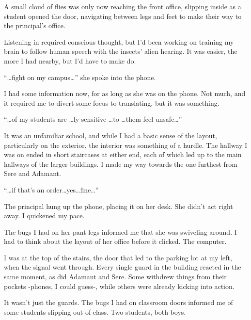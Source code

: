 A small cloud of flies was only now reaching the front office, slipping inside as a student opened the door, navigating between legs and feet to make their way to the principal's office.



Listening in required conscious thought, but I'd been working on training my brain to follow human speech with the insects' alien hearing.  It was easier, the more I had nearby, but I'd have to make do.



``\ldots{}fight on my campus\ldots'' she spoke into the phone.



I had some information now, for as long as she was on the phone.  Not much, and it required me to divert some focus to translating, but it was something.



``\ldots{}of my students are \ldots{}ly sensitive \ldots to \ldots them feel unsafe\ldots''



It was an unfamiliar school, and while I had a basic sense of the layout, particularly on the exterior, the interior was something of a hurdle.  The hallway I was on ended in short staircases at either end, each of which led up to the main hallways of the larger buildings.  I made my way towards the one furthest from Sere and Adamant.



``\ldots{}if that's an order\ldots yes\ldots fine\ldots''



The principal hung up the phone, placing it on her desk.  She didn't act right away.  I quickened my pace.



The bugs I had on her pant legs informed me that she was swiveling around.  I had to think about the layout of her office before it clicked.  The computer.



I was at the top of the stairs, the door that led to the parking lot at my left, when the signal went through.  Every single guard in the building reacted in the same moment, as did Adamant and Sere.  Some withdrew things from their pockets -phones, I could guess-, while others were already kicking into action.



It wasn't just the guards.  The bugs I had on classroom doors informed me of some students slipping out of class.  Two students, both boys.




